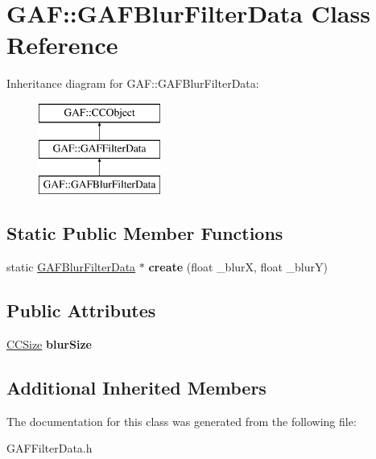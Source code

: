 \hypertarget{class_g_a_f_1_1_g_a_f_blur_filter_data}{\section{G\-A\-F\-:\-:G\-A\-F\-Blur\-Filter\-Data Class Reference}
\label{class_g_a_f_1_1_g_a_f_blur_filter_data}
}
Inheritance diagram for G\-A\-F\-:\-:G\-A\-F\-Blur\-Filter\-Data\-:\begin{figure}[H]
\begin{center}
\leavevmode
\includegraphics[height=3.000000cm]{class_g_a_f_1_1_g_a_f_blur_filter_data}
\end{center}
\end{figure}
\subsection*{Static Public Member Functions}
\begin{DoxyCompactItemize}
\item 
\hypertarget{class_g_a_f_1_1_g_a_f_blur_filter_data_a2959c14e886df2e3d00bacfa513b7f74}{static \hyperlink{class_g_a_f_1_1_g_a_f_blur_filter_data}{G\-A\-F\-Blur\-Filter\-Data} $\ast$ {\bfseries create} (float \-\_\-blur\-X, float \-\_\-blur\-Y)}\label{class_g_a_f_1_1_g_a_f_blur_filter_data_a2959c14e886df2e3d00bacfa513b7f74}

\end{DoxyCompactItemize}
\subsection*{Public Attributes}
\begin{DoxyCompactItemize}
\item 
\hypertarget{class_g_a_f_1_1_g_a_f_blur_filter_data_a3b3250afccae332781a2942c22981ff2}{\hyperlink{class_g_a_f_1_1_c_c_size}{C\-C\-Size} {\bfseries blur\-Size}}\label{class_g_a_f_1_1_g_a_f_blur_filter_data_a3b3250afccae332781a2942c22981ff2}

\end{DoxyCompactItemize}
\subsection*{Additional Inherited Members}


The documentation for this class was generated from the following file\-:\begin{DoxyCompactItemize}
\item 
G\-A\-F\-Filter\-Data.\-h\end{DoxyCompactItemize}
